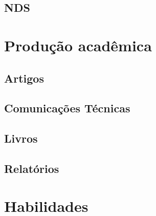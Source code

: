 \documentclass{article}
\begin{document}
\subsection{NDS}

\section{Produção acadêmica}

\subsection{Artigos}

\subsection{Comunicações Técnicas}

\subsection{Livros}

\subsection{Relatórios}

\section{Habilidades}
\end{document}
